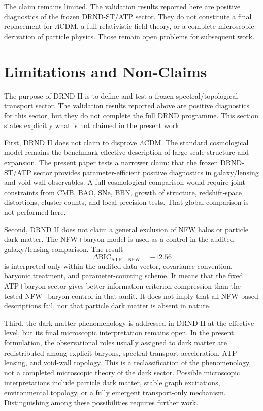 \documentclass[12pt]{iopart}
\begin{document}
The claim remains limited. The validation results reported here are positive diagnostics of the frozen DRND-ST/ATP sector. They do not constitute a final replacement for \(\Lambda\)CDM, a full relativistic field theory, or a complete microscopic derivation of particle physics. Those remain open problems for subsequent work.

\section{Limitations and Non-Claims}
\label{sec:limitations}

The purpose of DRND II is to define and test a frozen spectral/topological transport sector. The validation results reported above are positive diagnostics for this sector, but they do not complete the full DRND programme. This section states explicitly what is not claimed in the present work.

First, DRND II does not claim to disprove \(\Lambda\)CDM. The standard cosmological model remains the benchmark effective description of large-scale structure and expansion. The present paper tests a narrower claim: that the frozen DRND-ST/ATP sector provides parameter-efficient positive diagnostics in galaxy/lensing and void-wall observables. A full cosmological comparison would require joint constraints from CMB, BAO, SNe, BBN, growth of structure, redshift-space distortions, cluster counts, and local precision tests. That global comparison is not performed here.

Second, DRND II does not claim a general exclusion of NFW halos or particle dark matter. The NFW+baryon model is used as a control in the audited galaxy/lensing comparison. The result
\begin{equation}
\Delta\mathrm{BIC}_{\mathrm{ATP-NFW}}=-12.56
\end{equation}
is interpreted only within the audited data vector, covariance convention, baryonic treatment, and parameter-counting scheme. It means that the fixed ATP+baryon sector gives better information-criterion compression than the tested NFW+baryon control in that audit. It does not imply that all NFW-based descriptions fail, nor that particle dark matter is absent in nature.

Third, the dark-matter phenomenology is addressed in DRND II at the effective level, but its final microscopic interpretation remains open. In the present formulation, the observational roles usually assigned to dark matter are redistributed among explicit baryons, spectral-transport acceleration, ATP lensing, and void-wall topology. This is a reclassification of the phenomenology, not a completed microscopic theory of the dark sector. Possible microscopic interpretations include particle dark matter, stable graph excitations, environmental topology, or a fully emergent transport-only mechanism. Distinguishing among these possibilities requires further work.
\end{document}
